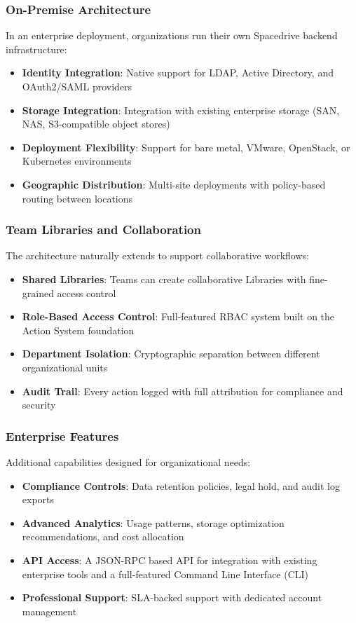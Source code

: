 \documentclass[sigconf]{acmart}
\begin{document}
\subsubsection{On-Premise Architecture}
In an enterprise deployment, organizations run their own Spacedrive backend infrastructure:
\begin{itemize}[noitemsep, topsep=0pt]
    \item \textbf{Identity Integration}: Native support for LDAP, Active Directory, and OAuth2/SAML providers
    \item \textbf{Storage Integration}: Integration with existing enterprise storage (SAN, NAS, S3-compatible object stores)
    \item \textbf{Deployment Flexibility}: Support for bare metal, VMware, OpenStack, or Kubernetes environments
    \item \textbf{Geographic Distribution}: Multi-site deployments with policy-based routing between locations
\end{itemize}

\subsubsection{Team Libraries and Collaboration}
The architecture naturally extends to support collaborative workflows:
\begin{itemize}[noitemsep, topsep=0pt]
    \item \textbf{Shared Libraries}: Teams can create collaborative Libraries with fine-grained access control
    \item \textbf{Role-Based Access Control}: Full-featured RBAC system built on the Action System foundation
    \item \textbf{Department Isolation}: Cryptographic separation between different organizational units
    \item \textbf{Audit Trail}: Every action logged with full attribution for compliance and security
\end{itemize}

\subsubsection{Enterprise Features}
Additional capabilities designed for organizational needs:
\begin{itemize}[noitemsep, topsep=0pt]
    \item \textbf{Compliance Controls}: Data retention policies, legal hold, and audit log exports
    \item \textbf{Advanced Analytics}: Usage patterns, storage optimization recommendations, and cost allocation
    \item \textbf{API Access}: A JSON-RPC based API for integration with existing enterprise tools and a full-featured Command Line Interface (CLI)
    \item \textbf{Professional Support}: SLA-backed support with dedicated account management
\end{itemize}
\end{document}
